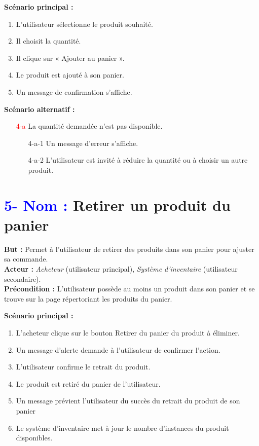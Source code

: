 \documentclass[16pt]{report}
\begin{document}
\textbf{Scénario principal :}
\begin{enumerate}[leftmargin=4em]
    \item L'utilisateur sélectionne le produit souhaité.
    \item Il choisit la quantité.
    \item Il clique sur « Ajouter au panier ».
    \item Le produit est ajouté à son panier.
    \item Un message de confirmation s'affiche.
\end{enumerate}

\textbf{Scénario alternatif :}
\begin{enumerate}[leftmargin=4em]
    \item[\textcolor{red}{4-a}] La quantité demandée n'est pas disponible.
    \begin{enumerate}[leftmargin=4em]
        \item[4-a-1] Un message d'erreur s'affiche.
        \item[4-a-2] L'utilisateur est invité à réduire la quantité ou à choisir un autre produit.
    \end{enumerate}
\end{enumerate}

\section*{\textbf{\textcolor{blue}{5- Nom :}} Retirer un produit du panier}

\textbf{But :} Permet à l’utilisateur de retirer des produits dans son panier pour ajuster sa commande. \\
\textbf{Acteur :} \textit{Acheteur} (utilisateur principal), \textit{Système d'inventaire} (utilisateur secondaire). \\
\textbf{Précondition :} L'utilisateur possède au moins un produit dans son panier et se trouve sur la page répertoriant 
les produits du panier.

\textbf{Scénario principal :}
\begin{enumerate}[leftmargin=4em]
    \item L’acheteur clique sur le bouton Retirer du panier du produit à éliminer.
    \item Un message d’alerte demande à l’utilisateur de confirmer l’action.
    \item L’utilisateur confirme le retrait du produit.
    \item Le produit est retiré du panier de l’utilisateur.
    \item Un message prévient l’utilisateur du succès du retrait du produit de son panier
    \item Le système d’inventaire met à jour le nombre d’instances du produit disponibles.
\end{enumerate}
\end{document}
